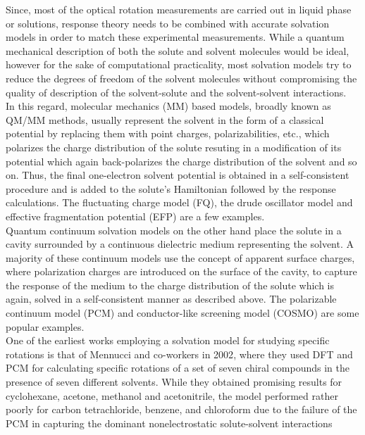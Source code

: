 Since, most of the optical rotation measurements are carried out in liquid phase or solutions,
response theory needs to be combined with accurate solvation models in order to match these
experimental measurements. While a quantum mechanical description of both the solute and solvent molecules would be ideal, 
however for the sake of computational practicality, most solvation models try to reduce the degrees of freedom of
the solvent molecules without compromising the quality of description of the solvent-solute and the solvent-solvent
interactions.\\
In this regard, molecular mechanics (MM) based models, broadly known as QM/MM methods, usually represent the
solvent in the form of a classical potential by replacing them with point charges, polarizabilities, etc.,\cite{Warshel72,Warshel76,Lin06}
which polarizes the charge distribution of the solute resuting in a modification of its potential which
again back-polarizes the charge distribution of the solvent and so on. Thus, the final one-electron solvent potential is obtained in a
self-consistent procedure and is added to the solute's Hamiltonian followed by the response calculations. The fluctuating
charge model (FQ)\cite{Rick94}, the drude oscillator model\cite{Lamoureux03} and effective fragmentation potential (EFP)\cite{JensenGordon96} are a few examples.\\
Quantum continuum solvation models on the other hand place the solute in a cavity surrounded by a continuous
dielectric medium representing the solvent. A majority of these continuum models use the
concept of apparent surface charges\cite{Miertus81}, where polarization charges are introduced on the surface of the 
cavity, to capture the response of the medium to the charge distribution of the solute which is again, 
solved in a self-consistent manner as described above. The polarizable continuum model (PCM) \cite{Mennucci98} and conductor-like 
screening model (COSMO) \cite{Klamt93} are some popular examples.\\
One of the earliest works employing a solvation model for studying specific rotations is that of 
Mennucci and co-workers in 2002\cite{Mennucci02}, where they used DFT and PCM for calculating 
specific rotations of a set of seven chiral compounds in the presence of seven different 
solvents. While they obtained promising results for cyclohexane, acetone, methanol and 
acetonitrile, the model performed rather poorly for carbon tetrachloride, benzene, and chloroform
due to the failure of the PCM in capturing the dominant nonelectrostatic solute-solvent interactions 
